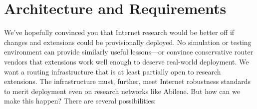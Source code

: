 
\section{Architecture and Requirements}

We've hopefully convinced you that Internet research would be better
off if changes and extensions could be provisionally deployed.
No simulation or testing environment can provide similarly useful lessons---or
convince conservative router vendors that extensions work well
enough to deserve real-world deployment.
We want a routing infrastructure that is at least partially open to
research extensions.
The infrastructure must, further, meet Internet robustness standards
to merit deployment even on research networks like Abilene.
But how can we make this happen?
There are several possibilities:


